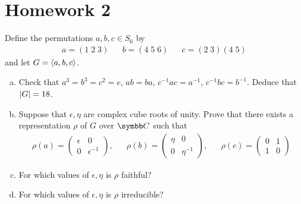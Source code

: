 \section*{Homework 2}

\begin{exercise}
Define the permutations \(a, b, c \in S_6\) by
\begin{align*}
    a = (1 \; 2 \; 3)& &b = (4 \; 5 \; 6)& &c = (2 \; 3) (4 \; 5)
\end{align*}
and let \(G = \left\langle a, b, c\right\rangle\).

\begin{enumerate}[(a)]
    \item Check that \(a^3 = b^3 = c^2 = e\), \(ab = ba\), \(c^{-1} a c = a^{-1}\), \(c^{-1} b c = b^{-1}\). Deduce that \(\left|G\right| = 18\).
    
    \item Suppose that \(\epsilon, \eta\) are complex cube roots of unity. Prove that there exists a representation \(\rho\) of \(G\) over \(\complex\) such that
    \begin{align*}
        \rho(a) = \begin{pmatrix}
            \epsilon & 0 \\
            0 & \epsilon^{-1}
        \end{pmatrix},
        &
        &\rho(b) = \begin{pmatrix}
            \eta & 0 \\
            0 & \eta^{-1}
        \end{pmatrix},
        &
        &\rho(c) = \begin{pmatrix}
            0 & 1 \\
            1 & 0
        \end{pmatrix}
    \end{align*}
    
    \item For which values of \(\epsilon, \eta\) is \(\rho\) faithful?
    
    \item For which values of \(\epsilon, \eta\) is \(\rho\) irreducible?
\end{enumerate}
\end{exercise}
